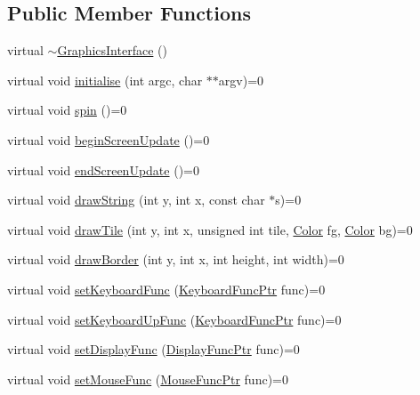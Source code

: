 \subsection*{Public Member Functions}
\begin{DoxyCompactItemize}
\item 
virtual \hyperlink{classGraphicsInterface_ada388bd981edb66e9d47c23a3ab11e70}{$\sim$\-Graphics\-Interface} ()
\item 
virtual void \hyperlink{classGraphicsInterface_a3a47a8e69b8f31a962bed451b3f7c498}{initialise} (int argc, char $\ast$$\ast$argv)=0
\item 
virtual void \hyperlink{classGraphicsInterface_a7eab61b47e23240090b339151809eb1d}{spin} ()=0
\item 
virtual void \hyperlink{classGraphicsInterface_a31ab6e9004825ec7ea337c2dd530114a}{begin\-Screen\-Update} ()=0
\item 
virtual void \hyperlink{classGraphicsInterface_aa6d993639a30dee68aa9aacd9ba1ad5c}{end\-Screen\-Update} ()=0
\item 
virtual void \hyperlink{classGraphicsInterface_aa58e5f8df996b8d64a456dedaa3bb549}{draw\-String} (int y, int x, const char $\ast$s)=0
\item 
virtual void \hyperlink{classGraphicsInterface_af46b9a83803b47cda354449d3afced25}{draw\-Tile} (int y, int x, unsigned int tile, \hyperlink{classColor}{Color} fg, \hyperlink{classColor}{Color} bg)=0
\item 
virtual void \hyperlink{classGraphicsInterface_a5ee4a7b699755b8348955b7e166c154b}{draw\-Border} (int y, int x, int height, int width)=0
\item 
virtual void \hyperlink{classGraphicsInterface_a306cf250c51013ff35c3a657d694f921}{set\-Keyboard\-Func} (\hyperlink{graphics__interface_8h_ae8b5bc37678d3ba69d310ca3c6e7393f}{Keyboard\-Func\-Ptr} func)=0
\item 
virtual void \hyperlink{classGraphicsInterface_ac79f6dfb01b2915fb2ce51efabd692c5}{set\-Keyboard\-Up\-Func} (\hyperlink{graphics__interface_8h_ae8b5bc37678d3ba69d310ca3c6e7393f}{Keyboard\-Func\-Ptr} func)=0
\item 
virtual void \hyperlink{classGraphicsInterface_a83af0372a01cd878a724ed81722b62cd}{set\-Display\-Func} (\hyperlink{graphics__interface_8h_a71f99ab7c9bb1fb2ae09a63a9d4d422b}{Display\-Func\-Ptr} func)=0
\item 
virtual void \hyperlink{classGraphicsInterface_a5730723c0b0e2d676ff11882076c1e6c}{set\-Mouse\-Func} (\hyperlink{graphics__interface_8h_a60715b4a82a8c09c76ddd8b483d768ef}{Mouse\-Func\-Ptr} func)=0
\end{DoxyCompactItemize}


